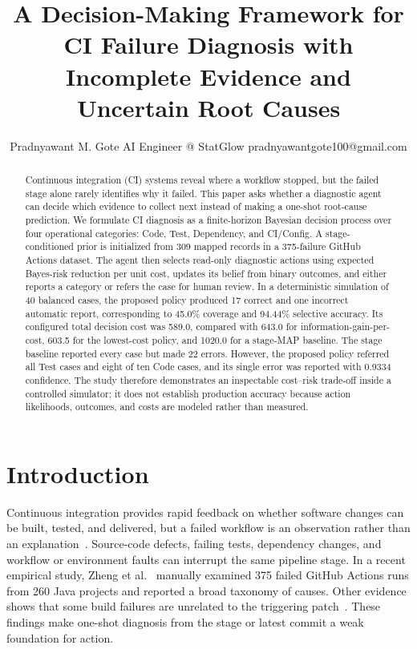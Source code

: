 \documentclass{article}
\title{A Decision-Making Framework for CI Failure Diagnosis with Incomplete Evidence and Uncertain Root Causes}
\author{
    Pradnyawant M. Gote
    \affiliations
    AI Engineer @ StatGlow
    \emails
    pradnyawantgote100@gmail.com
}
\begin{document}
\maketitle

\begin{abstract}
Continuous integration (CI) systems reveal where a workflow stopped, but the
failed stage alone rarely identifies why it failed. This paper asks whether a
diagnostic agent can decide which evidence to collect next instead of making a
one-shot root-cause prediction. We formulate CI diagnosis as a finite-horizon
Bayesian decision process over four operational categories: Code, Test,
Dependency, and CI/Config. A stage-conditioned prior is initialized from 309
mapped records in a 375-failure GitHub Actions dataset. The agent then selects
read-only diagnostic actions using expected Bayes-risk reduction per unit cost,
updates its belief from binary outcomes, and either reports a category or
refers the case for human review. In a deterministic simulation of 40 balanced
cases, the proposed policy produced 17 correct and one incorrect automatic
report, corresponding to 45.0\% coverage and 94.44\% selective accuracy. Its
configured total decision cost was 589.0, compared with 643.0 for
information-gain-per-cost, 603.5 for the lowest-cost policy, and 1020.0 for a
stage-MAP baseline. The stage baseline reported every case but made 22 errors.
However, the proposed policy referred all Test cases and eight of ten Code
cases, and its single error was reported with 0.9334 confidence. The study
therefore demonstrates an inspectable cost--risk trade-off inside a controlled
simulator; it does not establish production accuracy because action
likelihoods, outcomes, and costs are modeled rather than measured.
\end{abstract}

\section{Introduction}
\label{sec:introduction}

Continuous integration provides rapid feedback on whether software changes can
be built, tested, and delivered, but a failed workflow is an observation rather
than an explanation~\cite{Shahin2017Continuous}. Source-code defects, failing
tests, dependency changes, and workflow or environment faults can interrupt the
same pipeline stage. In a recent empirical study, Zheng et
al.~\cite{Zheng2026WorkflowFailures} manually examined 375 failed GitHub Actions
runs from 260 Java projects and reported a broad taxonomy of causes. Other
evidence shows that some build failures are unrelated to the triggering
patch~\cite{Huang2026UnrelatedFailures}. These findings make one-shot diagnosis
from the stage or latest commit a weak foundation for action.
\end{document}
